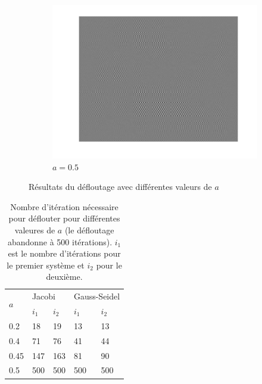 \begin{figure}
\begin{subfigure}[b]{0.3\textwidth}
    \includegraphics[width=\textwidth]{Q2/unblurred_50.png}
    \caption{$a = 0.5$}
    \label{fig:a5}
  \end{subfigure}
  \caption{Résultats du défloutage avec différentes valeurs de $a$}\label{fig:adiff}
\end{figure}

\begin{table}
  \centering
  \begin{tabular}{|l|l|l|l|l|}
    \hline
    \multirow{2}{*}{$a$} & \multicolumn{2}{l|}{Jacobi} & \multicolumn{2}{l|}{Gauss-Seidel}\\
    \cline{2-5}
        & $i_1$ & $i_2$ & $i_1$ & $i_2$\\
    \hline
    0.2 & 18    & 19    & 13    & 13\\
    \hline
    0.4 & 71    & 76    & 41    & 44\\
    \hline
    0.45& 147   & 163   & 81    & 90\\
    \hline
    0.5 & 500   & 500   & 500   & 500\\
    \hline
  \end{tabular}
  \caption{Nombre d'itération nécessaire pour déflouter pour différentes valeures de $a$ (le défloutage abandonne à 500 itérations).
  $i_1$ est le nombre d'itérations pour le premier système et $i_2$ pour le deuxième.}
  \label{tab:iter}
\end{table}
